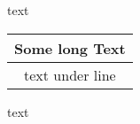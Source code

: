 \documentclass{standalone}
\makeatletter
\newcommand{\mycommand}[2]{\begin{tabular}[t]{@{} c @{}}
#1\\  \hline
#2
\end{tabular}}
\makeatother
\begin{document}
text \mycommand{Some long Text}{text under line} text
\end{document}
